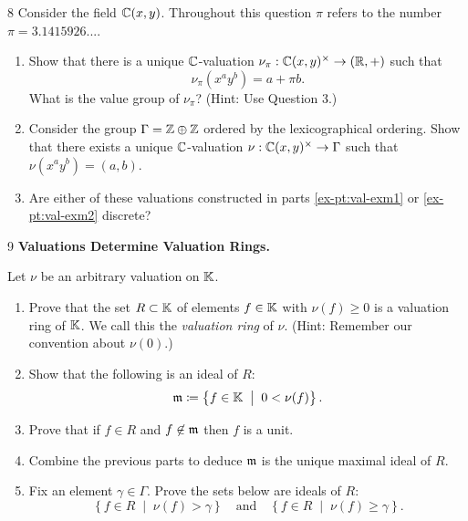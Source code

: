 \documentclass[Notebook.tex]{subfiles}
\begin{document}
    \begin{problem}{8}
        Consider the field $ \mathbb C(x, y)$. Throughout this question $\pi$ refers to the number $\pi=3.1415926...$.
        \begin{enumerate}[label=(\alph*),ref=\theenumi\alph*]
        \item\label{ex-pt:val-exm1} Show that there is a unique $\mathbb C$-valuation $\nu_{\pi}:\mathbb C(x,y)^{\times} \to (\mathbb R,+)$  such that 
        \[
        \nu_{\pi}\left(x^ay^b\right) = a + \pi b.
        \]
        What is the value group of $\nu_{\pi}$? (Hint: Use Question 3.) 
        \item\label{ex-pt:val-exm2} Consider the group $\Gamma = \mathbb Z\oplus\mathbb Z$ ordered by the lexicographical ordering. Show that there exists a unique $\mathbb C$-valuation $\nu:\mathbb C(x,y)^{\times} \to \Gamma$ such that $\nu(x^ay^b)=(a,b)$. 
        \item Are either of these valuations constructed in parts \ref{ex-pt:val-exm1} or \ref{ex-pt:val-exm2} discrete?
        \end{enumerate}
    \end{problem}
        
 
    \begin{problem}{9}
        \textbf{Valuations Determine Valuation Rings.}  
        
        Let $\nu$ be an arbitrary valuation on $\mathbb K$. 
        \begin{enumerate}[label=(\alph*),ref=\theenumi\alph*]
            \item Prove that the set $R \subset \mathbb K$ of elements $f\in \mathbb K$ with $\nu(f) \geq 0$ is a valuation ring of $\mathbb K$. We call this the \emph{valuation ring} of $\nu$. (Hint: Remember our convention about $\nu(0)$.)
            \item Show that the following is an ideal of $R$:
            \[
            \operatorname{\mathfrak{m}} \coloneqq \left\{ f \in \mathbb K \;\; \big| \;\; 0 < \nu(f) \right\}.
            \]
            \item Prove that if $f \in R$ and $f \not \in \operatorname{\mathfrak{m}}$ then $f$ is a unit.
            \item Combine the previous parts to deduce $\operatorname{\mathfrak{m}}$ is the unique maximal ideal of $R$. 
            \item Fix an element $\gamma \in \Gamma$. Prove the sets below are ideals of $R$:
            \[
            \left\{ f \in R \;\; \big|\;\; \nu(f) > \gamma \right\} \quad \text{and} \quad \left\{ f \in R \;\; \big|\;\; \nu(f) \geq \gamma \right\}.
            \]
        \end{enumerate}
    \end{problem}
 
\end{document}
